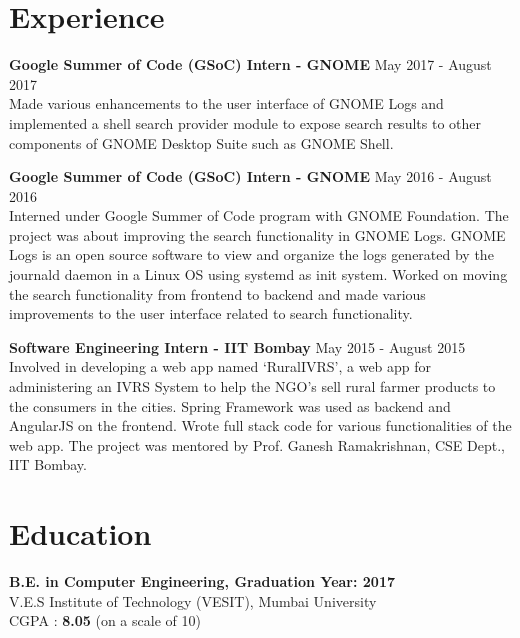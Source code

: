 \documentclass[11pt,margin, centered]{res}
\begin{document}
\begin{resume}



\section{Experience}
\vspace{8mm}

\textbf{Google Summer of Code (GSoC) Intern - GNOME} \hfill May 2017 - August 2017\\
Made various enhancements to the user interface of GNOME Logs and implemented a shell search provider module to expose search results to other components of GNOME Desktop Suite such as GNOME Shell.

\vspace{2mm}

\textbf{Google Summer of Code (GSoC) Intern - GNOME} \hfill May 2016 - August 2016\\
Interned under Google Summer of Code program with GNOME Foundation. The project was about improving the search functionality in GNOME Logs. GNOME Logs is an open source software to view and organize the logs generated by the journald daemon in a Linux OS using systemd as init system. Worked on moving the search functionality from frontend to backend and made various improvements to the user interface related to search functionality.

\vspace{2mm}

\textbf{Software Engineering Intern - IIT Bombay} \hfill May 2015 - August 2015\\
Involved in developing a web app named ‘RuralIVRS’, a web app for administering an IVRS System to help the NGO's sell rural farmer products to the consumers in the cities. Spring Framework was used as backend and AngularJS on the frontend. Wrote full stack code for various functionalities of the web app. The project was mentored by Prof. Ganesh Ramakrishnan, CSE Dept., IIT Bombay.



\section{Education}
\vspace{8mm}
\textbf{B.E. in Computer Engineering, Graduation Year: 2017} \\
V.E.S Institute of Technology (VESIT), Mumbai University \\
CGPA : \textbf{8.05} (on a scale of 10)


\end{resume}
\end{document}

